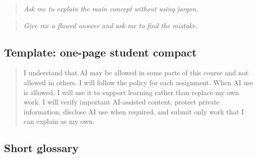 \documentclass{SIAMbook2023}
\newcommand{\studentprompt}[1]{\begin{quote}\small\itshape #1\end{quote}}
\begin{document}
\studentprompt{Ask me to explain the main concept without using jargon.}

\studentprompt{Give me a flawed answer and ask me to find the mistake.}

\subsection{Template: one-page student compact}
\label{app:compact}

\begin{quote}
I understand that AI may be allowed in some parts of this course and not allowed in others. I will follow the policy for each assignment. When AI use is allowed, I will use it to support learning rather than replace my own work. I will verify important AI-assisted content, protect private information, disclose AI use when required, and submit only work that I can explain as my own.
\end{quote}

\subsection{Short glossary}
\label{app:glossary}%
\end{document}
